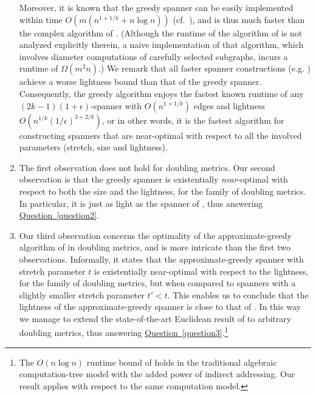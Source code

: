 \documentclass[11pt,letterpaper]{article}
\newcommand{\eps}{\epsilon}
\newcommand{\namedref}[2]{\hyperref[#2]{#1~\ref*{#2}}}
\newcommand{\questionref}[1]{\namedref{Question}{#1}}
\begin{document}
\begin{enumerate}
	\vspace{5pt}
	Moreover, it is known that the greedy spanner 
	can be easily implemented within time $O(m(n^{1 + 1/k} + n\log n))$ (cf.\ \cite{ES16}),
	and is thus much faster than the complex algorithm of  \cite{CW18}.
	(Although the runtime of the algorithm of \cite{CW18} is not analyzed explicitly therein,
	a naive implementation of that algorithm,
	which involves diameter computations of carefully selected subgraphs, incurs a runtime of $\Omega(m^2 n)$.)
	We remark that all faster spanner constructions (e.g. \cite{BS07,ES16,MPVX15,EN17,ADFSW19}) achieve a worse lightness bound than that of the greedy spanner.
	Consequently, the greedy algorithm enjoys the fastest known runtime of any $(2k-1)(1+\eps)$-spanner with $O(n^{1+1/k})$ edges and  lightness $O(n^{1/k} (1/\eps)^{3+2/k})$,
	or in other words, it is the fastest algorithm for constructing spanners that are near-optimal with respect to all the involved parameters (stretch, size and lightness).
	\vspace{6pt}
	\item The first observation does not hold for doubling metrics.
	Our second observation is that the greedy spanner is existentially \emph{near}-optimal with respect to both the size and the lightness,
	for the family of doubling metrics.
	In particular, it is just as light as the spanner of \cite{Got15}, thus answering \questionref{question2}.
	\vspace{6pt}
	\item Our third observation concerns the optimality of the approximate-greedy algorithm of \cite{DN97,GLN02} in doubling metrics, and is more intricate than the first two observations.
	Informally, it states that the approximate-greedy spanner with stretch parameter $t$ is existentially near-optimal with respect to the lightness,
	for the family of doubling metrics, but when compared to spanners with a slightly smaller stretch parameter $t' < t$.
	This enables us to conclude that the   lightness of the approximate-greedy spanner is close to that of \cite{Got15}.
	In this way we manage to extend the state-of-the-art Euclidean result of \cite{GLN02} to arbitrary doubling metrics, thus answering
	\questionref{question3}.\footnote{The $O(n \log n)$ runtime bound of \cite{GLN02} holds in the traditional algebraic computation-tree model with
		the added power of indirect addressing. Our result applies with respect to the same computation model.}
	

\end{enumerate}
\end{document}
